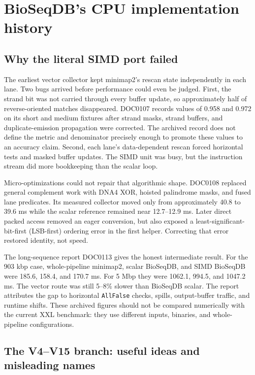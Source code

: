 \section{BioSeqDB's CPU implementation history}
\label{sec:minimizer-cpu-history}

\subsection{Why the literal SIMD port failed}

The earliest vector collector kept minimap2's rescan state independently in
each lane.  Two bugs arrived before performance could even be judged.  First,
the strand bit was not carried through every buffer update, so approximately
half of reverse-oriented matches disappeared. DOC0107 records values of 0.958
and 0.972 on its short and medium fixtures after strand masks, strand buffers,
and duplicate-emission propagation were corrected. The archived record does
not define the metric and denominator precisely enough to promote these values
to an accuracy claim. Second, each lane's data-dependent rescan forced
horizontal tests and masked buffer updates.  The SIMD unit was busy, but the
instruction stream did more bookkeeping than the scalar loop.

Micro-optimizations could not repair that algorithmic shape.  DOC0108 replaced
general complement work with DNA4 XOR, hoisted palindrome masks, and fused
lane predicates.  Its measured collector moved only from approximately
40.8 to 39.6 ms while the scalar reference remained near
12.7--12.9 ms.  Later direct packed access removed an eager conversion, but
also exposed a least-significant-bit-first (LSB-first) ordering error in the
first helper. Correcting that
error restored identity, not speed.

The long-sequence report DOC0113 gives the honest intermediate result.  For
the 903 kbp case, whole-pipeline minimap2, scalar BioSeqDB, and SIMD BioSeqDB
were 185.6, 158.4, and 170.7 ms. For 5 Mbp they were 1062.1, 994.5, and
1047.2 ms.  The vector route was still 5--8\% slower than BioSeqDB scalar.
The report attributes the gap to horizontal \texttt{AllFalse} checks, spills,
output-buffer traffic, and runtime shifts.  These archived figures should not
be compared numerically with the current XXL benchmark: they use different
inputs, binaries, and whole-pipeline configurations.

\subsection{The V4--V15 branch: useful ideas and misleading names}

